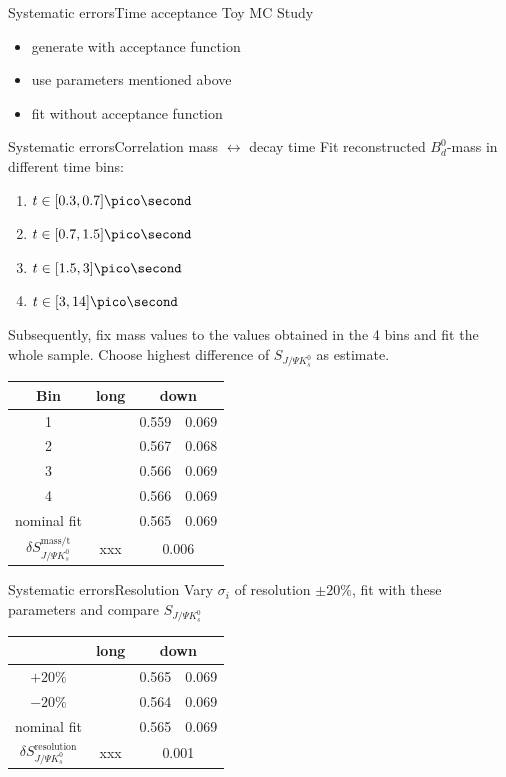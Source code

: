 \documentclass{beamer}
\newcommand{\Bd}{$B_d^0$}
\newcommand{\SJPsi}{S_{J/\Psi K_s^0}}
\begin{document}
\begin{frame}{Systematic errors}{Time acceptance}
Toy MC Study
\begin{itemize}
\item generate with acceptance function 
\item use parameters mentioned above
\item fit without acceptance function
\end{itemize}


\end{frame}

\begin{frame}{Systematic errors}{Correlation mass $\leftrightarrow$ decay time}
Fit reconstructed \Bd-mass in different time bins:
\begin{enumerate}
\item $t \in [0.3, 0.7] \pico\second$
\item $t \in [0.7, 1.5] \pico\second$
\item $t \in [1.5, 3] \pico\second$
\item $t \in [3, 14] \pico\second$
\end{enumerate}
Subsequently, fix mass values to the values obtained in the 4 bins and fit the whole sample. Choose highest difference of $\SJPsi$ as estimate.
\begin{center}
\begin{tabular}{c r@{$\pm$}l r@{$\pm$}l}
\hline \hline
Bin & \multicolumn{2}{c}{long} & \multicolumn{2}{c}{down} \\ \hline
1 & & & 0.559 & 0.069 \\
2 & & & 0.567 & 0.068 \\
3 & & & 0.566 & 0.069 \\
4 & & & 0.566 & 0.069 \\ \hline
nominal fit & & & 0.565 & 0.069 \\ \hline
$\delta\SJPsi^{\text{mass/t}}$ & \multicolumn{2}{c}{xxx} & \multicolumn{2}{c}{0.006} \\

\hline \hline
\end{tabular}
\end{center}
\end{frame}

\begin{frame}{Systematic errors}{Resolution}
Vary $\sigma_i$ of resolution $\pm 20\%$, fit with these parameters and compare $\SJPsi$
\begin{center}
\begin{tabular}{c r@{$\pm$}l r@{$\pm$}l}
\hline \hline
 & \multicolumn{2}{c}{long} & \multicolumn{2}{c}{down} \\ \hline
$+20\%$ & & & 0.565 & 0.069 \\
$-20\%$ & & & 0.564 & 0.069 \\ \hline
nominal fit & & & 0.565 & 0.069 \\ \hline
$\delta\SJPsi^{\text{resolution}}$ & \multicolumn{2}{c}{xxx} & \multicolumn{2}{c}{0.001} \\
\hline \hline
\end{tabular}
\end{center}
\end{frame}
\end{document}

